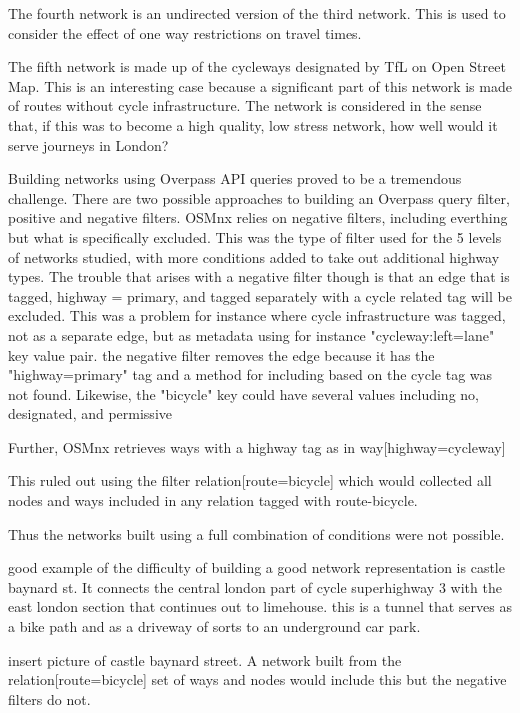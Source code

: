 The fourth network is an undirected version of the third network. This is used to consider the effect of one way restrictions on travel times. 

The fifth network is made up of the cycleways designated by TfL on Open Street Map. This is an interesting case because a significant part of this network is made of routes without cycle infrastructure. The network is considered in the sense that, if this was to become a high quality, low stress network, how well would it serve journeys in London? 


Building networks using Overpass API queries proved to be a tremendous challenge. There are two possible approaches to building an Overpass query filter, positive and negative filters. OSMnx relies on negative filters, including everthing but what is specifically excluded. This was the type of filter used for the 5 levels of networks studied, with more conditions added to take out additional highway types. The trouble that arises with a negative filter though is that an edge that is tagged, highway = primary, and tagged separately with a cycle related tag will be excluded. This was a problem for instance where cycle infrastructure was tagged, not as a separate edge, but as metadata using for instance "cycleway:left=lane" key value pair. the negative filter removes the edge because it has the "highway=primary" tag and a method for including based on the cycle tag was not found. Likewise, the "bicycle" key could have several values including no, designated, and permissive

Further, OSMnx retrieves ways with a highway tag as in way[highway=cycleway]

This ruled out using the filter relation[route=bicycle]  which would collected all nodes and ways included in any relation tagged with route-bicycle. 

Thus the networks built using a  full combination of conditions were not possible. 

good example of the difficulty of building a good network representation is castle baynard st. It connects the central london part of cycle superhighway 3 with the east london section that continues out to limehouse. this is a tunnel that serves as a bike path and as a driveway of sorts to an underground car park. 

insert picture of castle baynard street. A network built from the relation[route=bicycle] set of ways and nodes would include this but the negative filters do not. 



